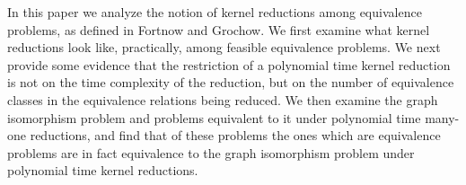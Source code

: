 In this paper we analyze the notion of kernel reductions among equivalence
problems, as defined in Fortnow and Grochow. We first examine what kernel
reductions look like, practically, among feasible equivalence problems. We next
provide some evidence that the restriction of a polynomial time kernel
reduction is not on the time complexity of the reduction, but on the number of
equivalence classes in the equivalence relations being reduced. We then examine
the graph isomorphism problem and problems equivalent to it under polynomial
time many-one reductions, and find that of these problems the ones which are
equivalence problems are in fact equivalence to the graph isomorphism problem
under polynomial time kernel reductions.

